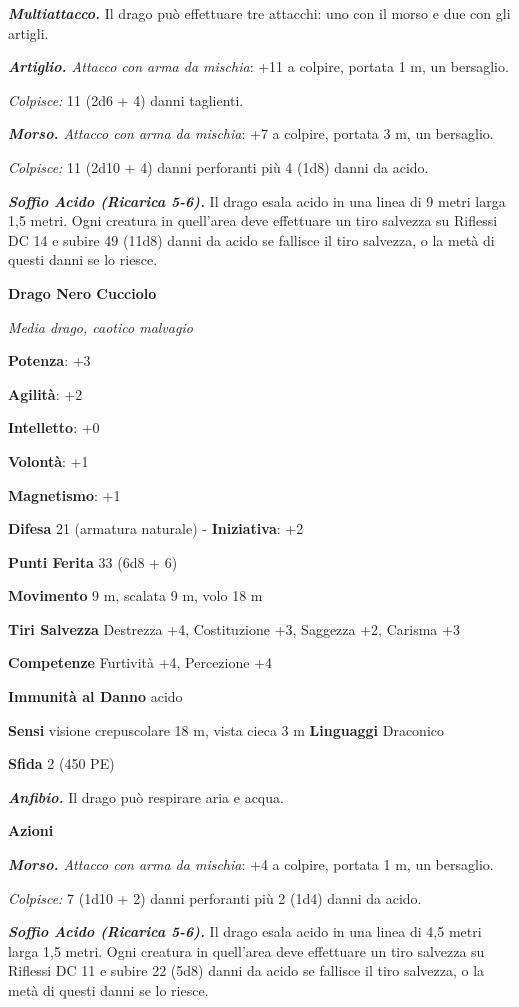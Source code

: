 \begin{multicols}{2}
\emph{\textbf{Multiattacco.}} Il drago può effettuare tre attacchi: uno
con il morso e due con gli artigli.

\emph{\textbf{Artiglio.} Attacco con arma da mischia}: +11 a colpire,
portata 1 m, un bersaglio.

\emph{Colpisce:} 11 (2d6 + 4) danni taglienti.

\emph{\textbf{Morso.} Attacco con arma da mischia}: +7 a colpire,
portata 3 m, un bersaglio.

\emph{Colpisce:} 11 (2d10 + 4) danni perforanti più 4 (1d8) danni da
acido.

\emph{\textbf{Soffio Acido (Ricarica 5-6).}} Il drago esala acido in una
linea di 9 metri larga 1,5 metri. Ogni creatura in quell'area deve
effettuare un tiro salvezza su Riflessi DC 14 e subire 49 (11d8) danni
da acido se fallisce il tiro salvezza, o la metà di questi danni se lo
riesce.

\textbf{Drago Nero Cucciolo}

\emph{Media drago, caotico malvagio}

\textbf{Potenza}: +3

\textbf{Agilità}: +2

\textbf{Intelletto}: +0

\textbf{Volontà}: +1

\textbf{Magnetismo}: +1

\textbf{Difesa} 21 (armatura naturale) - \textbf{Iniziativa}: +2

\textbf{Punti Ferita} 33 (6d8 + 6)

\textbf{Movimento} 9 m, scalata 9 m, volo 18 m

\textbf{Tiri Salvezza} Destrezza +4, Costituzione +3, Saggezza +2,
Carisma +3

\textbf{Competenze} Furtività +4, Percezione +4

\textbf{Immunità al Danno} acido

\textbf{Sensi} visione crepuscolare 18 m, vista cieca 3 m
\textbf{Linguaggi} Draconico

\textbf{Sfida} 2 (450 PE)\smallskip

\emph{\textbf{Anfibio.}} Il drago può respirare aria e acqua.

\smallskip\textbf{Azioni}

\emph{\textbf{Morso.} Attacco con arma da mischia}: +4 a colpire,
portata 1 m, un bersaglio.

\emph{Colpisce:} 7 (1d10 + 2) danni perforanti più 2 (1d4) danni da
acido.

\emph{\textbf{Soffio Acido (Ricarica 5-6).}} Il drago esala acido in una
linea di 4,5 metri larga 1,5 metri. Ogni creatura in quell'area deve
effettuare un tiro salvezza su Riflessi DC 11 e subire 22 (5d8) danni
da acido se fallisce il tiro salvezza, o la metà di questi danni se lo
riesce.


\end{multicols}
